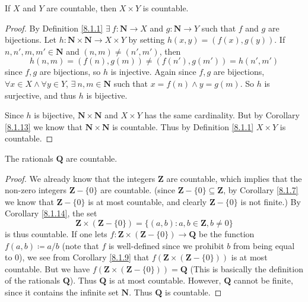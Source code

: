 \begin{corollary}\label{8.1.14}
    If \(X\) and \(Y\) are countable, then \(X \times Y\) is countable.
\end{corollary}

\begin{proof}
    By Definition \ref{8.1.1} \(\exists\ f : \mathbf{N} \to X\) and \(g : \mathbf{N} \to Y\) such that \(f\) and \(g\) are bijections.
    Let \(h : \mathbf{N} \times \mathbf{N} \to X \times Y\) by setting \(h(x, y) = (f(x), g(y))\).
    If \(n, n', m, m' \in \mathbf{N}\) and \((n, m) \neq (n', m')\), then
    \[
        h(n, m) = (f(n), g(m)) \neq (f(n'), g(m')) = h(n', m')
    \]
    since \(f, g\) are bijections, so \(h\) is injective.
    Again since \(f, g\) are bijections, \(\forall x \in X \land \forall y \in Y\), \(\exists\ n, m \in \mathbf{N}\) such that \(x = f(n) \land y = g(m)\).
    So \(h\) is surjective, and thus \(h\) is bijective.

    Since \(h\) is bijective, \(\mathbf{N} \times \mathbf{N}\) and \(X \times Y\) has the same cardinality.
    But by Corollary \ref{8.1.13} we know that \(\mathbf{N} \times \mathbf{N}\) is countable.
    Thus by Definition \ref{8.1.1} \(X \times Y\) is countable.
\end{proof}

\begin{corollary}\label{8.1.15}
    The rationals \(\mathbf{Q}\) are countable.
\end{corollary}

\begin{proof}
    We already know that the integers \(\mathbf{Z}\) are countable, which implies that the non-zero integers \(\mathbf{Z} - \{0\}\) are countable.
    (since \(\mathbf{Z} - \{0\} \subseteq \mathbf{Z}\), by Corollary \ref{8.1.7} we know that \(\mathbf{Z} - \{0\}\) is at most countable, and clearly \(\mathbf{Z} - \{0\}\) is not finite.)
    By Corollary \ref{8.1.14}, the set
    \[
        \mathbf{Z} \times (\mathbf{Z} - \{0\}) = \{(a, b) : a, b \in \mathbf{Z}, b \neq 0\}
    \]
    is thus countable.
    If one lets \(f : \mathbf{Z} \times (\mathbf{Z} - \{0\}) \to \mathbf{Q}\) be the function \(f(a, b) \coloneqq a / b\)
    (note that \(f\) is well-defined since we prohibit \(b\) from being equal to \(0\)), we see from Corollary \ref{8.1.9} that \(f(\mathbf{Z} \times (\mathbf{Z} - \{0\}))\) is at most countable.
    But we have \(f(\mathbf{Z} \times (\mathbf{Z} - \{0\})) = \mathbf{Q}\)
    (This is basically the definition of the rationals \(\mathbf{Q}\)).
    Thus \(\mathbf{Q}\) is at most countable.
    However, \(\mathbf{Q}\) cannot be finite, since it contains the infinite set \(\mathbf{N}\).
    Thus \(\mathbf{Q}\) is countable.
\end{proof}

